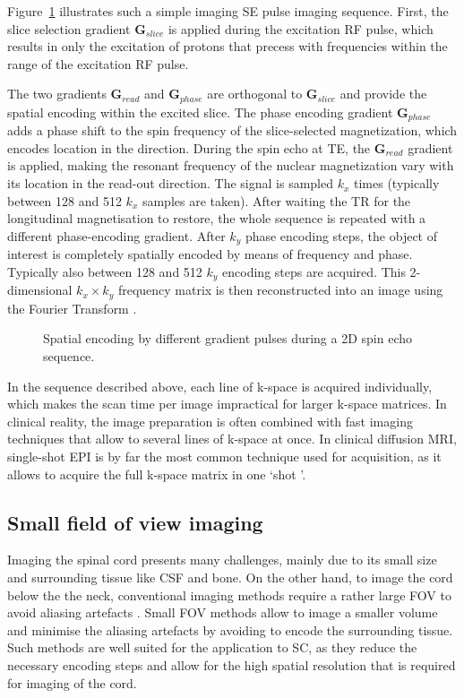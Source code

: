 Figure~\ref{fig:chapter2 SE imaging sequence} illustrates such a simple imaging SE pulse imaging sequence. First, the slice selection gradient $\textbf{G}_{slice}$ is applied during the excitation RF pulse, which results in only the excitation of protons that precess with frequencies within the range of the excitation RF pulse. 

The two gradients $\textbf{G}_{read}$ and $\textbf{G}_{phase}$ are orthogonal to $\textbf{G}_{slice}$ and provide the spatial encoding within the excited slice. The phase encoding gradient $\textbf{G}_{phase}$ adds a phase shift to the spin frequency of the slice-selected magnetization, which encodes location in the  direction. During the spin echo at TE, the $\textbf{G}_{read}$ gradient is applied, making the resonant frequency of the nuclear magnetization vary with its location in the read-out direction. The signal is sampled $k_x$ times (typically between 128 and 512 $k_x$ samples are taken).
After waiting the \gls{TR} for the longitudinal magnetisation to restore, the whole sequence is repeated with a different phase-encoding gradient. After $k_y$ phase encoding steps, the object of interest is completely spatially encoded by means of frequency and phase. Typically also between 128 and 512 $k_y$ encoding steps are acquired. This 2-dimensional $k_x\times k_y$ frequency matrix is then reconstructed into an image using the Fourier Transform \citep{Ljunggren:1983,Twieg:1983}.
\begin{figure}[ht]
\centering
{}
\caption{Spatial encoding by different gradient pulses during a 2D spin echo sequence.}
\label{fig:chapter2 SE imaging sequence}
\end{figure}

In the sequence described above, each line of k-space is acquired individually, which makes the scan time per image impractical for larger k-space matrices. In clinical reality, the image preparation is often combined with fast imaging techniques that allow to several lines of k-space at once\citep{Mansfield:1984,Stehling:1991}. In clinical diffusion MRI, single-shot \gls{EPI} is by far the most common technique used for acquisition, as it allows to acquire the full k-space matrix in one \lq shot \rq. 

\subsection{Small field of view imaging}
Imaging the spinal cord presents many challenges, mainly due to its small size and surrounding tissue like \gls{CSF} and bone. On the other hand, to image the cord below the the neck, conventional imaging methods require a rather large \gls{FOV} to avoid aliasing artefacts \citep{Bernstein:2004,McRobbie:2002}. Small \gls{FOV} methods allow to image a smaller volume and minimise the aliasing artefacts by avoiding to encode the surrounding tissue\citep{Feinberg:1985}. Such methods are well suited for the application to \gls{SC}, as they reduce the necessary encoding steps and allow for the high spatial resolution that is required for imaging of the cord.  


